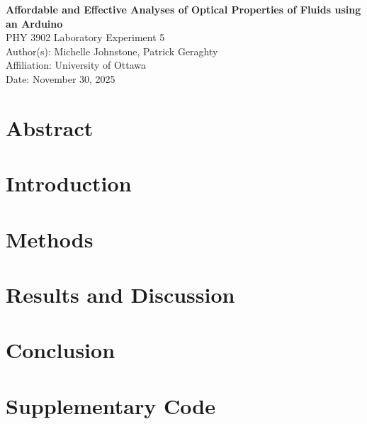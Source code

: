 \documentclass[12pt,a4paper]{article}
\begin{document}
\begin{center}
    {\LARGE\bfseries Affordable and Effective Analyses of Optical Properties of Fluids using an Arduino}\\[1.5em]
    {\large PHY 3902 Laboratory Experiment 5}\\[1em]
    {\large Author(s): Michelle Johnstone, Patrick Geraghty}\\
    {\large Affiliation: University of Ottawa}\\
    {\large Date: November 30, 2025}
\end{center}

\section{Abstract}\label{sec:abstract}


\section{Introduction}\label{sec:introduction}


\section{Methods}\label{sec:methods}


\section{Results and Discussion}\label{sec:results_and_discussion}


\section{Conclusion}\label{sec:conclusion}





\appendix
\section{Supplementary Code}\label{sec:supplementary-code}


\end{document}
